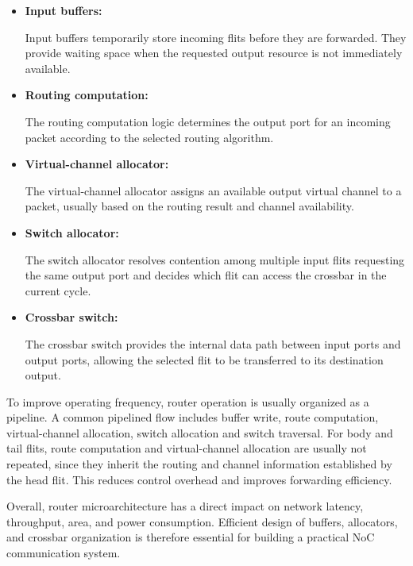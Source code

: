 \begin{itemize}
    \item \textbf{Input buffers:}

    Input buffers temporarily store incoming flits before they are forwarded. They provide waiting space when the requested output resource is not immediately available.

    \item \textbf{Routing computation:}

    The routing computation logic determines the output port for an incoming packet according to the selected routing algorithm.

    \item \textbf{Virtual-channel allocator:}

    The virtual-channel allocator assigns an available output virtual channel to a packet, usually based on the routing result and channel availability.

    \item \textbf{Switch allocator:}

    The switch allocator resolves contention among multiple input flits requesting the same output port and decides which flit can access the crossbar in the current cycle.

    \item \textbf{Crossbar switch:}

    The crossbar switch provides the internal data path between input ports and output ports, allowing the selected flit to be transferred to its destination output.
\end{itemize}

To improve operating frequency, router operation is usually organized as a pipeline. A common pipelined flow includes buffer write, route computation, virtual-channel allocation, switch allocation and switch traversal. For body and tail flits, route computation and virtual-channel allocation are usually not repeated, since they inherit the routing and channel information established by the head flit. This reduces control overhead and improves forwarding efficiency.

Overall, router microarchitecture has a direct impact on network latency, throughput, area, and power consumption. Efficient design of buffers, allocators, and crossbar organization is therefore essential for building a practical NoC communication system.